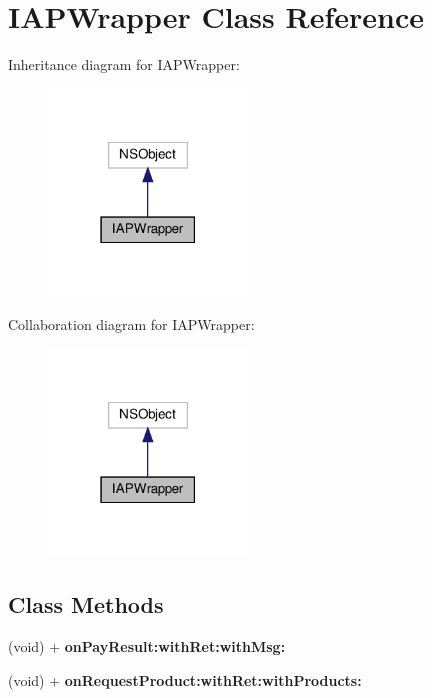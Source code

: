 \hypertarget{interfaceIAPWrapper}{}\section{I\+A\+P\+Wrapper Class Reference}
\label{interfaceIAPWrapper}


Inheritance diagram for I\+A\+P\+Wrapper\+:
\nopagebreak
\begin{figure}[H]
\begin{center}
\leavevmode
\includegraphics[width=150pt]{interfaceIAPWrapper__inherit__graph}
\end{center}
\end{figure}


Collaboration diagram for I\+A\+P\+Wrapper\+:
\nopagebreak
\begin{figure}[H]
\begin{center}
\leavevmode
\includegraphics[width=150pt]{interfaceIAPWrapper__coll__graph}
\end{center}
\end{figure}
\subsection*{Class Methods}
\begin{DoxyCompactItemize}
\item 
\mbox{\label{interfaceIAPWrapper_a4895b9f3f7f9d6a11bab262dceef44af}} 
(void) + {\bfseries on\+Pay\+Result\+:with\+Ret\+:with\+Msg\+:}
\item 
\mbox{\label{interfaceIAPWrapper_ac7abce675dcb8100fa47776c8f6a1afa}} 
(void) + {\bfseries on\+Request\+Product\+:with\+Ret\+:with\+Products\+:}
\end{DoxyCompactItemize}


